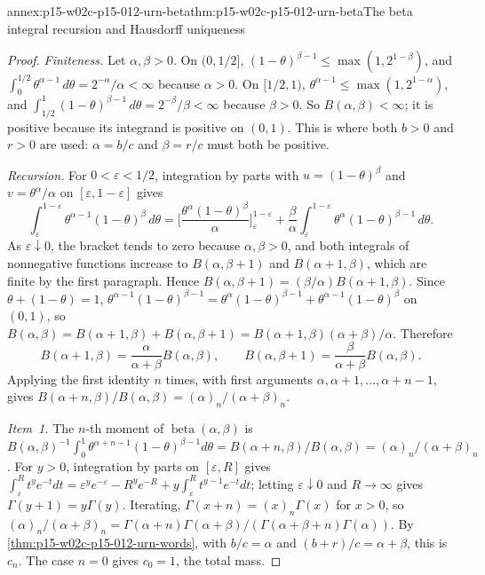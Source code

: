 \begin{annexitem}{annex:p15-w02c-p15-012-urn-beta}{thm:p15-w02c-p15-012-urn-beta}{The beta integral recursion and Hausdorff uniqueness}
\begin{proof}
\emph{Finiteness.} Let \(\alpha,\beta>0\). On \((0,1/2]\),
\((1-\theta)^{\beta-1}\leq\max(1,2^{1-\beta})\), and
\(\int_0^{1/2}\theta^{\alpha-1}\,d\theta=2^{-\alpha}/\alpha<\infty\)
because \(\alpha>0\). On \([1/2,1)\),
\(\theta^{\alpha-1}\leq\max(1,2^{1-\alpha})\), and
\(\int_{1/2}^1(1-\theta)^{\beta-1}\,d\theta=2^{-\beta}/\beta<\infty\)
because \(\beta>0\). So \(B(\alpha,\beta)<\infty\); it is positive because
its integrand is positive on \((0,1)\). This is where both \(b>0\) and
\(r>0\) are used: \(\alpha=b/c\) and \(\beta=r/c\) must both be positive.

\emph{Recursion.} For \(0<\varepsilon<1/2\), integration by parts with
\(u=(1-\theta)^\beta\) and \(v=\theta^\alpha/\alpha\) on
\([\varepsilon,1-\varepsilon]\) gives
\[
 \int_\varepsilon^{1-\varepsilon}\theta^{\alpha-1}(1-\theta)^\beta\,d\theta
 =\Big[\frac{\theta^\alpha(1-\theta)^\beta}{\alpha}\Big]_\varepsilon^{1-\varepsilon}
  +\frac\beta\alpha\int_\varepsilon^{1-\varepsilon}
        \theta^\alpha(1-\theta)^{\beta-1}\,d\theta .
\]
As \(\varepsilon\downarrow0\), the bracket tends to zero because
\(\alpha,\beta>0\), and both integrals of nonnegative functions increase
to \(B(\alpha,\beta+1)\) and \(B(\alpha+1,\beta)\), which are finite by
the first paragraph. Hence \(B(\alpha,\beta+1)=(\beta/\alpha)B(\alpha+1,\beta)\).
Since \(\theta+(1-\theta)=1\),
\(\theta^{\alpha-1}(1-\theta)^{\beta-1}
 =\theta^\alpha(1-\theta)^{\beta-1}+\theta^{\alpha-1}(1-\theta)^\beta\)
on \((0,1)\), so
\(B(\alpha,\beta)=B(\alpha+1,\beta)+B(\alpha,\beta+1)
 =B(\alpha+1,\beta)(\alpha+\beta)/\alpha\). Therefore
\[
 B(\alpha+1,\beta)=\frac{\alpha}{\alpha+\beta}B(\alpha,\beta),\qquad
 B(\alpha,\beta+1)=\frac{\beta}{\alpha+\beta}B(\alpha,\beta).
\]
Applying the first identity \(n\) times, with first arguments
\(\alpha,\alpha+1,\ldots,\alpha+n-1\), gives
\(B(\alpha+n,\beta)/B(\alpha,\beta)=(\alpha)_n/(\alpha+\beta)_n\).

\emph{Item~1.} The \(n\)-th moment of \(\operatorname{beta}(\alpha,\beta)\)
is \(B(\alpha,\beta)^{-1}\int_0^1\theta^{\alpha+n-1}(1-\theta)^{\beta-1}d\theta
=B(\alpha+n,\beta)/B(\alpha,\beta)=(\alpha)_n/(\alpha+\beta)_n\).
For \(y>0\), integration by parts on \([\varepsilon,R]\) gives
\(\int_\varepsilon^Rt^ye^{-t}dt=\varepsilon^ye^{-\varepsilon}-R^ye^{-R}
+y\int_\varepsilon^Rt^{y-1}e^{-t}dt\); letting \(\varepsilon\downarrow0\)
and \(R\to\infty\) gives \(\Gamma(y+1)=y\Gamma(y)\). Iterating,
\(\Gamma(x+n)=(x)_n\Gamma(x)\) for \(x>0\), so
\((\alpha)_n/(\alpha+\beta)_n
 =\Gamma(\alpha+n)\Gamma(\alpha+\beta)/(\Gamma(\alpha+\beta+n)\Gamma(\alpha))\).
By \cref{thm:p15-w02c-p15-012-urn-words}, with \(b/c=\alpha\) and
\((b+r)/c=\alpha+\beta\), this is \(c_n\). The case \(n=0\) gives
\(c_0=1\), the total mass.


\end{proof}
\end{annexitem}
